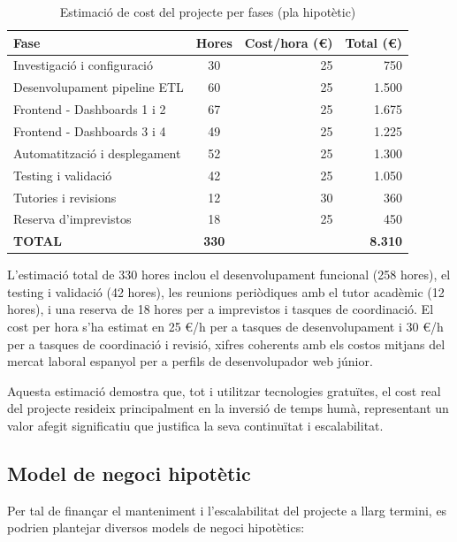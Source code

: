 \begin{table}[h]
\centering
\caption{Estimació de cost del projecte per fases (pla hipotètic)}
\begin{tabular}{|l|c|r|r|}
\hline
\textbf{Fase} & \textbf{Hores} & \textbf{Cost/hora (€)} & \textbf{Total (€)} \\
\hline
Investigació i configuració & 30 & 25 & 750 \\
\hline
Desenvolupament pipeline ETL & 60 & 25 & 1.500 \\
\hline
Frontend - Dashboards 1 i 2 & 67 & 25 & 1.675 \\
\hline
Frontend - Dashboards 3 i 4 & 49 & 25 & 1.225 \\
\hline
Automatització i desplegament & 52 & 25 & 1.300 \\
\hline
Testing i validació & 42 & 25 & 1.050 \\
\hline
Tutories i revisions & 12 & 30 & 360 \\
\hline
Reserva d'imprevistos & 18 & 25 & 450 \\
\hline
\textbf{TOTAL} & \textbf{330} & & \textbf{8.310} \\
\hline
\end{tabular}
\label{tab:cost-estimation}
\end{table}

L'estimació total de 330 hores inclou el desenvolupament funcional (258 hores), el testing i validació (42 hores), les reunions periòdiques amb el tutor acadèmic (12 hores), i una reserva de 18 hores per a imprevistos i tasques de coordinació. El cost per hora s'ha estimat en 25 €/h per a tasques de desenvolupament i 30 €/h per a tasques de coordinació i revisió, xifres coherents amb els costos mitjans del mercat laboral espanyol per a perfils de desenvolupador web júnior.

Aquesta estimació demostra que, tot i utilitzar tecnologies gratuïtes, el cost real del projecte resideix principalment en la inversió de temps humà, representant un valor afegit significatiu que justifica la seva continuïtat i escalabilitat.

\subsection{Model de negoci hipotètic}

Per tal de finançar el manteniment i l'escalabilitat del projecte a llarg termini, es podrien plantejar diversos models de negoci hipotètics:

